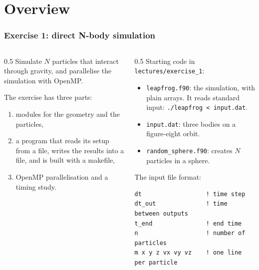 
\subtitle{Course exercise 1: direct N-body simulation with OpenMP}



\begin{frame}
  \titlepage
\end{frame}

\section{Overview}

\begin{frame}[fragile]
  \frametitle{Exercise 1: direct N-body simulation}
  \begin{columns}[T]
    \begin{column}{0.5\textwidth}
      Simulate $N$ particles that interact through gravity, and parallelise the simulation with OpenMP.

      \vspace*{2mm}
      The exercise has three parts:
      \begin{enumerate}
        \item modules for the geometry and the particles,
        \item a program that reads its setup from a file, writes the results into a file, and is built with a makefile,
        \item OpenMP parallelisation and a timing study.
      \end{enumerate}
    \end{column}

    \begin{column}{0.5\textwidth}
      Starting code in \texttt{lectures/exercise\_1}:
      \begin{itemize}
        \item \texttt{leapfrog.f90}: the simulation, with plain arrays. It reads standard input: \mbox{\texttt{./leapfrog < input.dat}}.
        \item \texttt{input.dat}: three bodies on a figure-eight orbit.
        \item \texttt{random\_sphere.f90}: creates $N$ particles in a sphere.
      \end{itemize}
      The input file format:
      \begin{lstlisting}[language={}]
dt                  ! time step
dt_out              ! time between outputs
t_end               ! end time
n                   ! number of particles
m x y z vx vy vz    ! one line per particle
      \end{lstlisting}
    \end{column}
  \end{columns}
\end{frame}


